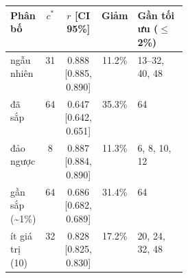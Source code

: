 \begin{tabular}{lcccp{0.3\linewidth}}
\toprule
Phân bố & $c^*$ & $r$ [CI 95\%] & Giảm & Gần tối ưu ($\le$2\%) \\
\midrule
ngẫu nhiên & 31 & 0.888 [0.885, 0.890] & 11.2\% & 13--32, 40, 48 \\
đã sắp & 64 & 0.647 [0.642, 0.651] & 35.3\% & 64 \\
đảo ngược & 8 & 0.887 [0.884, 0.890] & 11.3\% & 6, 8, 10, 12 \\
gần sắp (\textasciitilde 1\%) & 64 & 0.686 [0.682, 0.689] & 31.4\% & 64 \\
ít giá trị (10) & 32 & 0.828 [0.825, 0.830] & 17.2\% & 20, 24, 32, 48 \\
\bottomrule
\end{tabular}

